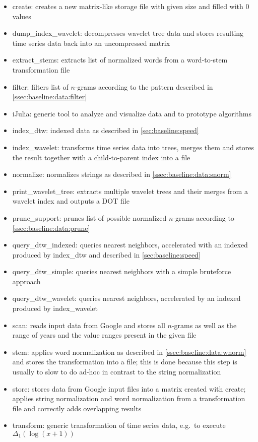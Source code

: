 \begin{itemize}
    \item create: creates a new matrix-like storage file with given size and filled with $0$ values
    \item dump\_index\_wavelet: decompresses wavelet tree data and stores resulting time series data back into an uncompressed matrix
    \item extract\_stems: extracts list of normalized words from a word-to-stem transformation file
    \item filter: filters list of $n$-grams according to the pattern described in \autoref{ssec:baseline:data:filter}
    \item iJulia: generic tool to analyze and visualize data and to prototype algorithms
    \item index\_dtw: indexed data as described in \autoref{sec:baseline:speed}
    \item index\_wavelet: transforms time series data into trees, merges them and stores the result together with a child-to-parent index into a file
    \item normalize: normalizes strings as described in \autoref{ssec:baseline:data:snorm}
    \item print\_wavelet\_tree: extracts multiple wavelet trees and their merges from a wavelet index and outputs a DOT file
    \item prune\_support: prunes list of possible normalized $n$-grams according to \autoref{ssec:baseline:data:prune}
    \item query\_dtw\_indexed: queries nearest neighbors, accelerated with an indexed produced by index\_dtw and described in \autoref{sec:baseline:speed}
    \item query\_dtw\_simple: queries nearest neighbors with a simple bruteforce approach
    \item query\_dtw\_wavelet: queries nearest neighbors, accelerated by an indexed produced by index\_wavelet
    \item scan: reads input data from Google and stores all $n$-grams as well as the range of years and the value ranges present in the given file
    \item stem: applies word normalization as described in \autoref{ssec:baseline:data:wnorm} and stores the transformation into a file; this is done because this step is usually to slow to do ad-hoc in contrast to the string normalization
    \item store: stores data from Google input files into a matrix created with create; applies string normalization and word normalization from a transformation file and correctly adds overlapping results
    \item transform: generic transformation of time series data, e.g.\ to execute $\Delta_1(\log(x + 1))$
\end{itemize}

